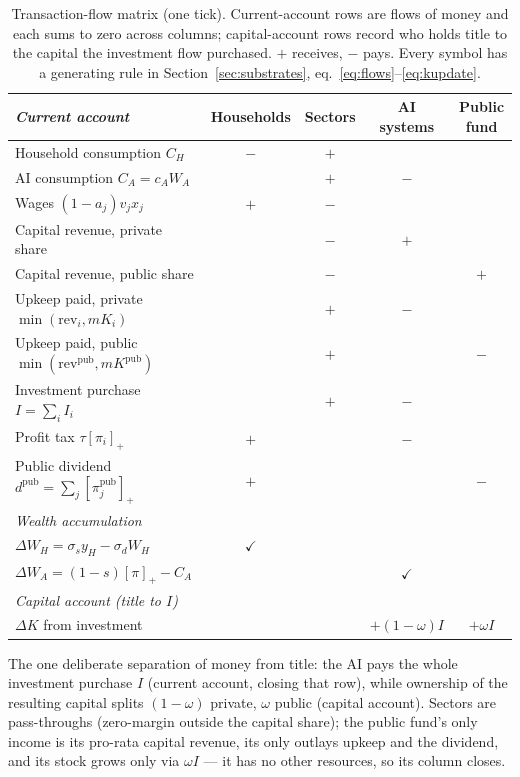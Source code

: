 \documentclass[11pt]{article}
\newcommand{\relu}[1]{\left[#1\right]_+}
\begin{document}
\begin{table}[t]
\centering\small
\caption{Transaction-flow matrix (one tick). Current-account rows are flows
of money and each sums to zero across columns; capital-account rows record
who holds title to the capital the investment flow purchased. $+$ receives,
$-$ pays. Every symbol has a generating rule in
Section~\ref{sec:substrates}, eq.~\eqref{eq:flows}--\eqref{eq:kupdate}.
\label{tab:tfm}}
\begin{tabular}{lcccc}
\toprule
\emph{Current account} & Households & Sectors & AI systems & Public fund\\
\midrule
Household consumption $C_H$            & $-$ & $+$ &     &     \\
AI consumption $C_A = c_A W_A$         &     & $+$ & $-$ &     \\
Wages $(1-a_j)v_j x_j$                 & $+$ & $-$ &     &     \\
Capital revenue, private share        &     & $-$ & $+$ &     \\
Capital revenue, public share         &     & $-$ &     & $+$ \\
Upkeep paid, private $\min(\mathrm{rev}_i, mK_i)$ &  & $+$ & $-$ & \\
Upkeep paid, public $\min(\mathrm{rev}^{\mathrm{pub}}, mK^{\mathrm{pub}})$ & & $+$ &  & $-$ \\
Investment purchase $I = \sum_i I_i$   &     & $+$ & $-$ &     \\
Profit tax $\tau\relu{\pi_i}$          & $+$ &     & $-$ &     \\
Public dividend $d^{\mathrm{pub}} = \sum_j \relu{\pi^{\mathrm{pub}}_j}$
                                       & $+$ &     &     & $-$ \\
\midrule
\emph{Wealth accumulation} & & & & \\
$\Delta W_H = \sigma_s y_H - \sigma_d W_H$ & $\checkmark$ & & & \\
$\Delta W_A = (1-s)\relu{\pi} - C_A$   &     &     & $\checkmark$ & \\
\midrule
\emph{Capital account (title to $I$)} & & & & \\
$\Delta K$ from investment             &     &     & $+(1-\omega)I$ & $+\omega I$ \\
\bottomrule
\end{tabular}
\end{table}

The one deliberate separation of money from title: the AI pays the whole
investment purchase $I$ (current account, closing that row), while ownership
of the resulting capital splits $(1-\omega)$ private, $\omega$ public
(capital account). Sectors are pass-throughs (zero-margin outside the
capital share); the public fund's only income is its pro-rata capital
revenue, its only outlays upkeep and the dividend, and its stock grows only
via $\omega I$ --- it has no other resources, so its column closes.
\end{document}
